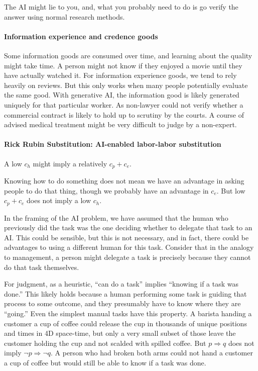 \documentclass{article}
\begin{document}
The AI might lie to you, and, what you probably need to do is go verify the answer using normal research methods.

\paragraph{Information experience and credence goods}
Some information goods are consumed over time, and learning about the quality might take time. 
A person might not know if they enjoyed a movie until they have actually watched it. 
For information experience goods, we tend to rely heavily on reviews. 
But this only works when many people potentially evaluate the same good. 
With generative AI, the information good is likely generated uniquely for that particular worker. 
As non-lawyer could not verify whether a commercial contract is likely to hold up to scrutiny by the courts. 
A course of advised medical treatment might be very difficult to judge by a non-expert.


\paragraph{Rick Rubin Substitution: AI-enabled labor-labor substitution}

A low $c_h$ might imply a relatively $c_p + c_e$.

Knowing how to do something does not mean we have an advantage in asking people to do that thing, though we probably have an advantage in $c_e$.
But low $c_p + c_e$ does not imply a low $c_h$.

In the framing of the AI problem, we have assumed that the human who previously did the task was the one deciding whether to delegate that task to an AI. 
This could be sensible, but this is not necessary, and in fact, there could be advantages to using a different human for this task.
Consider that in the analogy to management, a person might delegate a task is precisely because they cannot do that task themselves. 

For judgment, as a heuristic, ``can do a task'' implies ``knowing if a task was done.''
This likely holds because a human performing some task is guiding that process to some outcome, and they presumably have to know where they are ``going.''
Even the simplest manual tasks have this property.  
A barista handing a customer a cup of coffee could release the cup in thousands of unique positions and times in 4D space-time, but only a very small subset of those leave the customer holding the cup and not scalded with spilled coffee. 
But $p \Rightarrow q$ does not imply $\neg p \Rightarrow \neg q$.
A person who had broken both arms could not hand a customer a cup of coffee but would still be able to know if a task was done.
\end{document}
